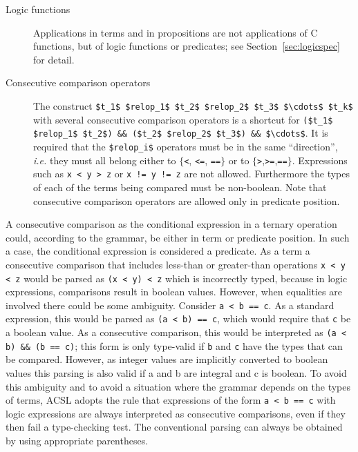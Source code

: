 \begin{description}
\item[Logic functions] Applications in terms and in propositions are not
applications of C functions, but of logic functions or predicates; see
Section~\ref{sec:logicspec} for detail.

\item[Consecutive comparison operators]
  The construct
\lstinline|$t_1$ $relop_1$ $t_2$ $relop_2$ $t_3$ $\cdots$ $t_k$| with
  several consecutive comparison operators is a shortcut for
  \lstinline|($t_1$ $relop_1$ $t_2$) && ($t_2$ $relop_2$ $t_3$) && $\cdots$|.
  It is required that the \lstinline|$relop_i$| operators must be in
  the same ``direction'', \emph{i.e.} they must all belong either to
  $\{$\lstinline|<|, \lstinline|<=|, \lstinline|==|$\}$ or to
  $\{$\lstinline|>|,\lstinline|>=|,\lstinline|==|$\}$. Expressions such as
  \lstinline|x < y > z| or \lstinline|x != y != z| are not allowed.
  Furthermore the types of each of the terms being compared must be non-boolean.
  Note that consecutive comparison operators are allowed only
  in predicate position.

  \end{description}

  A consecutive comparison as the conditional expression in a ternary operation could, according to the grammar, be either in term or
  predicate position. In such a case, the conditional expression is
  considered a predicate. As a term a consecutive comparison that includes less-than or greater-than operations
  \lstinline|x < y < z| would
  be parsed as \lstinline|(x < y) < z| which is incorrectly typed,
  because in logic expressions, comparisons result in boolean values.
  However, when equalities are involved there could be some ambiguity.
  Consider \lstinline|a < b == c|. As a standard expression, this would be parsed as
  \lstinline|(a < b) == c|, which would require that \lstinline|c| be a boolean value.
  As a consecutive comparison, this would be interpreted as
  \lstinline|(a < b) && (b == c)|; this form is only type-valid if \lstinline|b| and
  \lstinline|c| have the types that can be compared. However, as integer values are
  implicitly converted to boolean values this parsing is also valid if a and b are integral and c is boolean.
  To avoid this ambiguity and to avoid a situation where the grammar depends on the types of terms,
  ACSL adopts the rule that expressions of the form \lstinline|a < b == c| with logic expressions
  are always interpreted as consecutive comparisons, even if they then fail a type-checking test.
  The conventional parsing can always be obtained by using appropriate parentheses.

